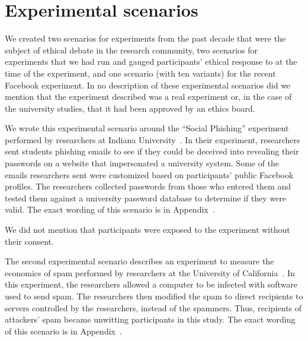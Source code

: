 \section{Experimental scenarios}
\label{sec:scenarios}

We created two scenarios for experiments from the past decade that were the subject of ethical debate in the research community, two scenarios for experiments that we had run and gauged participants' ethical response to at the time of the experiment, and one scenario (with ten variants) for the recent Facebook experiment.  In no description of these experimental scenarios did we mention that the experiment described was a real experiment or, in the case of the university studies, that it had been approved by an ethics board.


We wrote this experimental scenario around the ``Social Phishing'' experiment performed by researchers at Indiana University~\cite{Jagatic2007:SocialPhishing}.  In their experiment, researchers sent students phishing emails to see if they could be deceived into revealing their passwords on a website that impersonated a university system.  Some of the emails researchers sent were customized based on participants' public Facebook profiles. The researchers collected passwords from those who entered them and tested them against a university password database to determine if they were valid.  The exact wording of this scenario is in Appendix~.

We did not mention that participants were exposed to the experiment without their consent.

The second experimental scenario describes an experiment to measure the economics of spam performed by researchers at the University of California~\cite{Kanich2008:Spamalytics}.  In this experiment, the researchers allowed a computer to be infected with software used to send spam.  The researchers then modified the spam to direct recipients to servers controlled by the researchers, instead of the spammers.  Thus, recipients of attackers' spam became unwitting participants in this study.  The exact wording of this scenario is in Appendix~.

